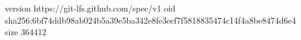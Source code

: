 version https://git-lfs.github.com/spec/v1
oid sha256:6bf74ddb98ab024b5a39e5ba342e8fe3eef7f5818835474c14f4a8be8474d6e4
size 364412
